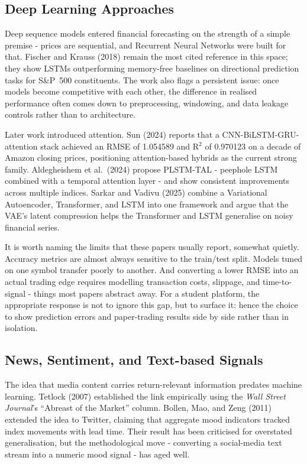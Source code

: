 \documentclass[12pt,a4paper]{report}
\numberwithin{equation}{chapter}
\begin{document}
\subsection{Deep Learning Approaches}

Deep sequence models entered financial forecasting on the strength of a simple premise - prices are sequential, and Recurrent Neural Networks were built for that. Fischer and Krauss (2018) remain the most cited reference in this space; they show LSTMs outperforming memory-free baselines on directional prediction tasks for S\&P~500 constituents. The work also flags a persistent issue: once models become competitive with each other, the difference in realised performance often comes down to preprocessing, windowing, and data leakage controls rather than to architecture.

Later work introduced attention. Sun (2024) reports that a CNN-BiLSTM-GRU-attention stack achieved an RMSE of 1.054589 and R$^2$ of 0.970123 on a decade of Amazon closing prices, positioning attention-based hybrids as the current strong family. Aldegheishem et al.\ (2024) propose PLSTM-TAL - peephole LSTM combined with a temporal attention layer - and show consistent improvements across multiple indices. Sarkar and Vadivu (2025) combine a Variational Autoencoder, Transformer, and LSTM into one framework and argue that the VAE's latent compression helps the Transformer and LSTM generalise on noisy financial series.

It is worth naming the limits that these papers usually report, somewhat quietly. Accuracy metrics are almost always sensitive to the train/test split. Models tuned on one symbol transfer poorly to another. And converting a lower RMSE into an actual trading edge requires modelling transaction costs, slippage, and time-to-signal - things most papers abstract away. For a student platform, the appropriate response is not to ignore this gap, but to surface it: hence the choice to show prediction errors and paper-trading results side by side rather than in isolation.

\subsection{News, Sentiment, and Text-based Signals}

The idea that media content carries return-relevant information predates machine learning. Tetlock (2007) established the link empirically using the \textit{Wall Street Journal}'s ``Abreast of the Market'' column. Bollen, Mao, and Zeng (2011) extended the idea to Twitter, claiming that aggregate mood indicators tracked index movements with lead time. Their result has been criticised for overstated generalisation, but the methodological move - converting a social-media text stream into a numeric mood signal - has aged well.
\end{document}
